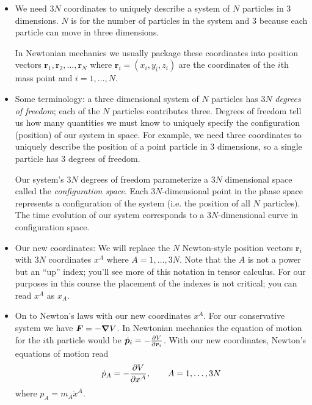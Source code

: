 \documentclass[11pt, a4paper]{article}
\newcommand{\bdot}[1]{\dot{\bm{#1}}} %
\begin{document}
\begin{itemize}
	\item We need $ 3N $ coordinates to uniquely describe a system of $ N $ particles in 3 dimensions. $ N $ is for the number of particles in the system and $ 3 $ because each particle can move in three dimensions.
	
	In Newtonian mechanics we usually package these coordinates into position vectors $ \bm{r}_1, \bm{r}_{2}, \dots, \bm{r}_{N} $ where $ \bm{r}_{i} = (x_i, y_i, z_i)  $ are the coordinates of the $ i $th mass point and $ i = 1, \ldots, N $.
	
	\item Some terminology: a three dimensional system of $ N $ particles has $ 3N $ \textit{degrees of freedom}; each of the $ N $ particles contributes three. Degrees of freedom tell us how many quantities we must know to uniquely specify the configuration (position) of our system in space. For example, we need three coordinates to uniquely describe the position of a point particle in 3 dimensions, so a single particle has $ 3 $ degrees of freedom.
	
	Our system's $ 3N $ degrees of freedom parameterize a $ 3N $ dimensional space called the \textit{configuration space}. Each $ 3N $-dimensional point in the phase space represents a configuration of the system (i.e. the position of all $ N $ particles). The time evolution of our system corresponds to a $ 3N $-dimensional curve in configuration space.
	
	\item Our new coordinates: We will replace the $ N $ Newton-style position vectors $ \bm{r}_{i} $ with $ 3N $ coordinates $ x^{A} $ where $ A = 1, \ldots, 3N $. Note that the $ A $ is not a power but an ``up'' index; you'll see more of this notation in tensor calculus. For our purposes in this course  the placement of the indexes is not critical; you can read $ x^{A} $ as $ x_{A} $.
	
	\item On to Newton's laws with our new coordinates $ x^{A} $. For our conservative system we have $ \bm{F} = - \grad V $. In Newtonian mechanics the equation of motion for the $ i $th particle would be $ \bdot{p}_{i} = - \pdv{V}{\bm{r}_{i}}$. With our new coordinates, Newton's equations of motion read
	\begin{equation*}
		\dot{p}_{A} = - \pdv{V}{x^{A}}, \qquad A = 1, \ldots, 3N
	\end{equation*}
	where $ p_{A} = m_{A}\dot{x}^{A} $.
	
\end{itemize}
\end{document}
